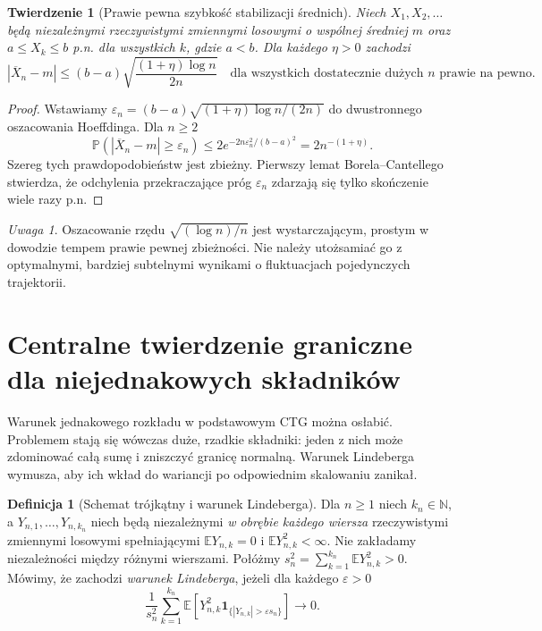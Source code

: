 \documentclass[11pt,a4paper,oneside]{report}
\numberwithin{equation}{chapter}
\theoremstyle{plain}
\newtheorem{twierdzenie}{Twierdzenie}[chapter]
\theoremstyle{definition}
\newtheorem{definicja}{Definicja}[chapter]
\theoremstyle{remark}
\newtheorem{uwaga}{Uwaga}[chapter]
\newcommand{\N}{\mathbb{N}}
\newcommand{\Prob}{\mathbb{P}}
\newcommand{\E}{\mathbb{E}}
\newcommand{\ind}[1]{\mathbf{1}_{#1}}
\begin{document}
\begin{twierdzenie}[Prawie pewna szybkość stabilizacji średnich]
Niech $X_1,X_2,\ldots$ będą niezależnymi rzeczywistymi
zmiennymi losowymi o wspólnej średniej $m$ oraz
$a\leq X_k\leq b$ p.n. dla wszystkich $k$,
gdzie $a<b$. Dla każdego $\eta>0$ zachodzi
\[
|\overline X_n-m|\leq
(b-a)\sqrt{\frac{(1+\eta)\log n}{2n}}
\quad\text{dla wszystkich dostatecznie dużych }n
\text{ prawie na pewno}.
\]
\end{twierdzenie}
\begin{proof}
Wstawiamy
$\varepsilon_n=(b-a)\sqrt{(1+\eta)\log n/(2n)}$
do dwustronnego oszacowania Hoeffdinga. Dla $n\geq2$
\[
\Prob(|\overline X_n-m|\geq\varepsilon_n)
\leq2e^{-2n\varepsilon_n^2/(b-a)^2}
=2n^{-(1+\eta)}.
\]
Szereg tych prawdopodobieństw jest zbieżny.
Pierwszy lemat Borela--Cantellego stwierdza, że
odchylenia przekraczające próg $\varepsilon_n$
zdarzają się tylko skończenie wiele razy p.n.
\end{proof}

\begin{uwaga}
Oszacowanie rzędu $\sqrt{(\log n)/n}$ jest
wystarczającym, prostym w dowodzie tempem
prawie pewnej zbieżności. Nie należy utożsamiać
go z optymalnymi, bardziej subtelnymi wynikami
o fluktuacjach pojedynczych trajektorii.
\end{uwaga}

\section{Centralne twierdzenie graniczne dla niejednakowych składników}

Warunek jednakowego rozkładu w podstawowym CTG
można osłabić. Problemem stają się wówczas duże,
rzadkie składniki: jeden z nich może zdominować
całą sumę i zniszczyć granicę normalną.
Warunek Lindeberga wymusza, aby ich wkład do
wariancji po odpowiednim skalowaniu zanikał.

\begin{definicja}[Schemat trójkątny i warunek Lindeberga]
Dla $n\geq1$ niech $k_n\in\N$, a
$Y_{n,1},\ldots,Y_{n,k_n}$ niech będą
niezależnymi \emph{w obrębie każdego wiersza}
rzeczywistymi zmiennymi losowymi spełniającymi
$\E Y_{n,k}=0$ i $\E Y_{n,k}^2<\infty$.
Nie zakładamy niezależności między różnymi wierszami.
Połóżmy
$s_n^2=\sum_{k=1}^{k_n}\E Y_{n,k}^2>0$.
Mówimy, że zachodzi \emph{warunek Lindeberga}, jeżeli
 dla każdego $\varepsilon>0$
\[
\frac1{s_n^2}\sum_{k=1}^{k_n}
\E\left[Y_{n,k}^2\ind{\{|Y_{n,k}|>\varepsilon s_n\}}\right]
\longrightarrow0.
\]
\end{definicja}
\end{document}
